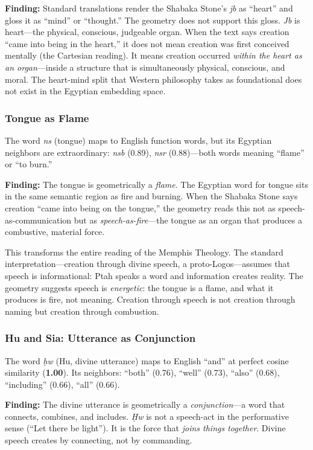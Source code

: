 \documentclass[11pt, a4paper]{article}
\begin{document}
{\color{insight}\textbf{Finding:}} Standard translations render the Shabaka Stone's \textit{jb} as ``heart'' and gloss it as ``mind'' or ``thought.'' The geometry does not support this gloss. \textit{Jb} is heart---the physical, conscious, judgeable organ. When the text says creation ``came into being in the heart,'' it does not mean creation was first conceived mentally (the Cartesian reading). It means creation occurred \textit{within the heart as an organ}---inside a structure that is simultaneously physical, conscious, and moral. The heart-mind split that Western philosophy takes as foundational does not exist in the Egyptian embedding space.

\subsubsection{Tongue as Flame}

The word \textit{ns} (tongue) maps to English function words, but its Egyptian neighbors are extraordinary: \textit{nsb} (0.89), \textit{nsr} (0.88)---both words meaning ``flame'' or ``to burn.''

{\color{insight}\textbf{Finding:}} The tongue is geometrically a \textit{flame}. The Egyptian word for tongue sits in the same semantic region as fire and burning. When the Shabaka Stone says creation ``came into being on the tongue,'' the geometry reads this not as speech-as-communication but as \textit{speech-as-fire}---the tongue as an organ that produces a combustive, material force.

This transforms the entire reading of the Memphis Theology. The standard interpretation---creation through divine speech, a proto-Logos---assumes that speech is informational: Ptah speaks a word and information creates reality. The geometry suggests speech is \textit{energetic}: the tongue is a flame, and what it produces is fire, not meaning. Creation through speech is not creation through naming but creation through combustion.

\subsubsection{Hu and Sia: Utterance as Conjunction}

The word \textit{ḥw} (Hu, divine utterance) maps to English ``and'' at perfect cosine similarity (\textbf{1.00}). Its neighbors: ``both'' (0.76), ``well'' (0.73), ``also'' (0.68), ``including'' (0.66), ``all'' (0.66).

{\color{insight}\textbf{Finding:}} The divine utterance is geometrically a \textit{conjunction}---a word that connects, combines, and includes. \textit{Ḥw} is not a speech-act in the performative sense (``Let there be light''). It is the force that \textit{joins things together}. Divine speech creates by connecting, not by commanding.
\end{document}
